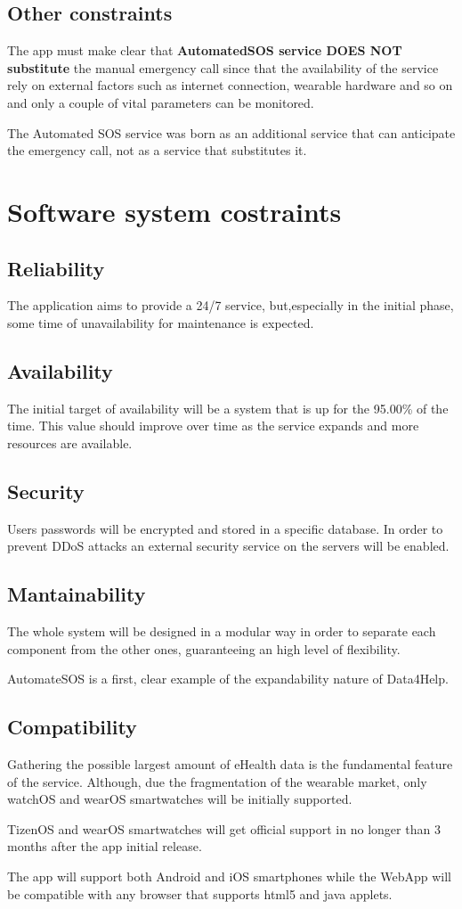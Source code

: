 \subsection{Other constraints}
The app must make clear that \textbf{AutomatedSOS service DOES NOT substitute} the manual emergency call since that the availability of the service rely on external factors such as internet connection, wearable hardware and so on and only a couple of vital parameters can be monitored.


The Automated SOS service was born as an additional service that can anticipate the emergency call, not as a service that substitutes it.


\section{Software system costraints}
\subsection{Reliability}
The application aims to provide a 24/7 service, but,especially in the initial phase, some time of unavailability for maintenance is expected.
\subsection{Availability}
The initial target of availability will be a system that is up for the 95.00\% of the time. This value should improve over time as the service expands and more resources are available.
\subsection{Security}
Users passwords will be encrypted and stored in a specific database.
In order to prevent DDoS attacks an external security service on the servers will be enabled.
\subsection{Mantainability}
The whole system will be designed in a modular way in order to separate each component from the other ones, guaranteeing an high level of flexibility. 

AutomateSOS is a first, clear example of the expandability nature of Data4Help.
\subsection{Compatibility}
Gathering the possible largest amount of eHealth data is the fundamental feature of the service. Although, due the fragmentation of the wearable market, only watchOS and wearOS smartwatches will be initially supported. 

TizenOS and wearOS smartwatches will get official support in no longer than 3 months after the app initial release.

The app will support both Android and iOS smartphones while the WebApp will be compatible with any browser that supports html5 and java applets.